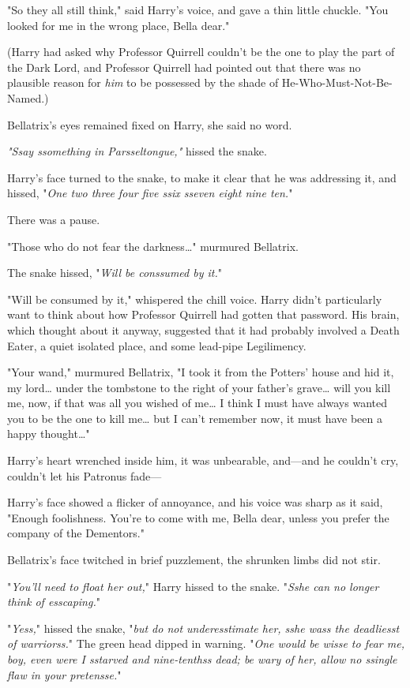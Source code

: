 "So they all still think," said Harry's voice, and gave a thin little chuckle. 
"You looked for me in the wrong place, Bella dear."

(Harry had asked why Professor Quirrell couldn't be the one to play the part of 
the Dark Lord, and Professor Quirrell had pointed out that there was no 
plausible reason for \emph{him} to be possessed by the shade of 
He-Who-Must-Not-Be-Named.)

Bellatrix's eyes remained fixed on Harry, she said no word.

\emph{"Ssay ssomething in Parsseltongue,"} hissed the snake.

Harry's face turned to the snake, to make it clear that he was addressing it, 
and hissed, "\emph{One two three four five ssix sseven eight nine ten.}"

There was a pause.

"Those who do not fear the darkness{\ldots}" murmured Bellatrix.

The snake hissed, "\emph{Will be conssumed by it.}"

"Will be consumed by it," whispered the chill voice. Harry didn't particularly 
want to think about how Professor Quirrell had gotten that password. His brain, 
which thought about it anyway, suggested that it had probably involved a Death 
Eater, a quiet isolated place, and some lead-pipe Legilimency.

"Your wand," murmured Bellatrix, "I took it from the Potters' house and hid it, 
my lord{\ldots} under the tombstone to the right of your father's grave{\ldots} 
will you kill me, now, if that was all you wished of me{\ldots} I think I must 
have always wanted you to be the one to kill me{\ldots} but I can't remember 
now, it must have been a happy thought{\ldots}"

Harry's heart wrenched inside him, it was unbearable, and---and he couldn't 
cry, couldn't let his Patronus fade---

Harry's face showed a flicker of annoyance, and his voice was sharp as it said, 
"Enough foolishness. You're to come with me, Bella dear, unless you prefer the 
company of the Dementors."

Bellatrix's face twitched in brief puzzlement, the shrunken limbs did not stir.

"\emph{You'll need to float her out,}" Harry hissed to the snake. "\emph{Sshe 
can no longer think of esscaping.}"

"\emph{Yess,}" hissed the snake, "\emph{but do not underesstimate her, sshe 
wass the deadliesst of warriorss.}" The green head dipped in warning. 
"\emph{One would be wisse to fear me, boy, even were I sstarved and 
nine-tenthss dead; be wary of her, allow no ssingle flaw in your pretensse.}"

